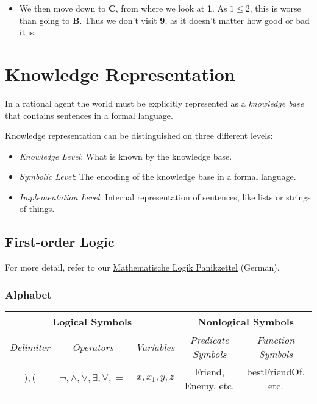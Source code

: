 \documentclass[english]{panikzettel}
\begin{document}
\begin{itemize}[leftmargin=*]
    \item We then move down to \textbf{C}, from where we look at \textbf{1}. As $1 \le 2$, this is worse than going to \textbf{B}. Thus we don't visit \textbf{9}, as it doesn't matter how good or bad it is.
\end{itemize}


\section{Knowledge Representation}

In a rational agent the world must be explicitly represented as a \emph{knowledge base} that contains sentences in a formal language.

Knowledge representation can be distinguished on three different levels:
\begin{itemize}
    \item \emph{Knowledge Level}: What is known by the knowledge base.
    \item \emph{Symbolic Level}: The encoding of the knowledge base in a formal language.
    \item \emph{Implementation Level}: Internal representation of sentences, like lists or strings of things.
\end{itemize}

\subsection{First-order Logic}

For more detail, refer to our \href{./malo.pdf}{Mathematische Logik Panikzettel} (German).

\subsubsection{Alphabet}

\begin{center}
\begin{tabular}{ccccc}
\multicolumn{3}{c}{\textbf{Logical Symbols}}                       & \multicolumn{2}{c}{\textbf{Nonlogical Symbols}} \\ \hline
\emph{Delimiter} & \emph{Operators}                              & \emph{Variables}     & \emph{Predicate Symbols}       & \emph{Function Symbols}      \\ \hline
\enskip $), ($ \enskip     & \enskip $\neg, \land, \lor, \exists, \forall, =$ \enskip & \enskip $x, x_1, y, z$ \enskip & \enskip Friend, Enemy, etc. \enskip    & \enskip bestFriendOf, etc. \enskip   \\
          &                                        &               &                         &
\end{tabular}
\end{center}
\end{document}
